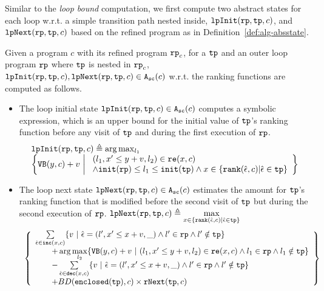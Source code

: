 Similar to the \emph{loop bound} computation,
we first compute two abstract states for each loop w.r.t. a simple transition path nested inside,
$\mathtt{lpInit}(\mathtt{rp}, \mathtt{tp}, c)$, and $\mathtt{lpNext}(\mathtt{rp}, \mathtt{tp}, c)$ based on the refined program
as in Definition~\ref{def:alg-absstate}.
\begin{defn}
\label{def:alg-loopabsstate}
Given a program $c$ with its refined program $\mathtt{rp}_c$, for a $\mathtt{tp}$ and an outer loop program $\mathtt{rp}$ where $\mathtt{tp}$ is nested in $\mathtt{rp}_c$,
$\mathtt{lpInit}(\mathtt{rp}, \mathtt{tp}, c), \mathtt{lpNext}(\mathtt{rp}, \mathtt{tp}, c) \in {\ensuremath{\mathtt{A_{sc}}}}(c)$
w.r.t. the ranking functions are computed as follows.
 \begin{itemize}%
 \item 
The loop initial state 
$\mathtt{lpInit}(\mathtt{rp}, \mathtt{tp}, c) \in {\ensuremath{\mathtt{A_{sc}}}}(c)$ computes a symbolic expression, which is an upper bound for the initial value of $\mathtt{tp}$'s ranking function before
any visit of $\mathtt{tp}$ and during the first execution of $\mathtt{rp}$.
\[
 \begin{array}{l}
 \lpinit(\rprog, \tpath, c) \triangleq 
 \arg\max_{l_1}
 \\
 \left\{
 \varinvar(y, c) + v ~\middle\vert~ 
 \begin{array}{l} 
 (l_1, x' \leq y + v, l_2) \in \reset(x, c) 
 \\
 \land \absinit(\rprog) \leq l_1 \leq \absinit(\tpath)
 \land
 x \in \left\{ \locbound(\absevent, c) | \absevent \in \tpath \right\}
 \end{array}
 \right\}
 \end{array}
 \]
\item
The loop next state 
$\mathtt{lpNext}(\mathtt{rp}, \mathtt{tp}, c) \in {\ensuremath{\mathtt{A_{sc}}}}(c)$ 
estimates the amount for $\mathtt{tp}$'s ranking function
that is modified before
the second visit of $\mathtt{tp}$ but during the second execution of $\mathtt{rp}$.
$ 
\lpnext(\rprog, \tpath, c) \triangleq 
\max\limits_{x \in \left\{ \locbound(\absevent, c) | \absevent \in \tpath \right\}}
$
%
{\small
\[
 \begin{array}{l}
 \left\{
 \begin{array}{l}
 \sum\limits_{\absevent \in \inc(x, c) }
 \left\{ 
 v ~\middle\vert~ \absevent = (l', x' \leq x + v, \_) \land l' \in \rprog 
 \land l' \notin \tpath \right\}
 \\ \qquad 
 + \arg\max\limits_{l_2 }
 \left\{ \varinvar(y, c) + v ~\middle\vert~ 
 (l_1, x' \leq y + v, l_2) \in \reset(x, c) \land l_1 \in \rprog \land l_1 \notin \tpath\right\}
 \\ \qquad 
 - \sum\limits_{ \absevent \in \dec(x, c) }\left\{ 
 v 
 ~\middle\vert~ \absevent = (l', x' \leq x + v, \_) \land l' \in \rprog \land l' \notin \tpath \right\}
 \\ \qquad 
 + BD(\kw{enclosed}(\tpath), c) \times \rfnext(\tpath, c)
 \end{array}
 \right\}
 \end{array}
 \]
 }
 \end{itemize}
\end{defn}
